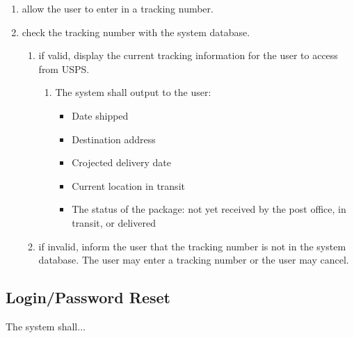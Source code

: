 \documentclass{scrreprt}
\begin{document}
\begin{enumerate}
\item allow the user to enter in a tracking number.
\item check the tracking number with the system database.
\begin{enumerate}
\item if valid, display the current tracking information for the user to access
from USPS.
\begin{enumerate}
\item The system shall output to the user:
\begin{itemize}
\item Date shipped
\item Destination address
\item Crojected delivery date
\item Current location in transit
\item The status of the package: not yet received by the post office, in
transit, or delivered
\end{itemize}
\end{enumerate}
\item if invalid, inform the user that the tracking number is not in the system
database. The user may enter a tracking number or the user may cancel. 
\end{enumerate}
\end{enumerate}

\subsection{Login/Password Reset}

The system shall...
\end{document}
